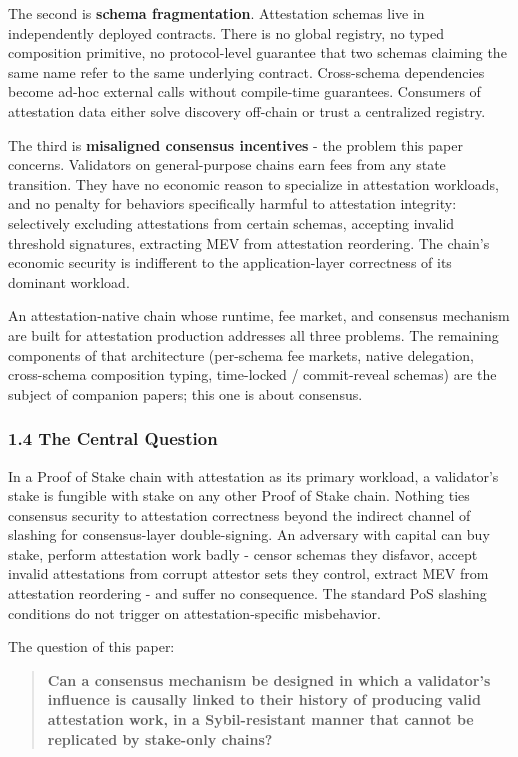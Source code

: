 \documentclass[
  11pt,
]{article}
\begin{document}
The second is \textbf{schema fragmentation}. Attestation schemas live in
independently deployed contracts. There is no global registry, no typed
composition primitive, no protocol-level guarantee that two schemas
claiming the same name refer to the same underlying contract.
Cross-schema dependencies become ad-hoc external calls without
compile-time guarantees. Consumers of attestation data either solve
discovery off-chain or trust a centralized registry.

The third is \textbf{misaligned consensus incentives} - the problem this
paper concerns. Validators on general-purpose chains earn fees from any
state transition. They have no economic reason to specialize in
attestation workloads, and no penalty for behaviors specifically harmful
to attestation integrity: selectively excluding attestations from
certain schemas, accepting invalid threshold signatures, extracting MEV
from attestation reordering. The chain's economic security is
indifferent to the application-layer correctness of its dominant
workload.

An attestation-native chain whose runtime, fee market, and consensus
mechanism are built for attestation production addresses all three
problems. The remaining components of that architecture (per-schema fee
markets, native delegation, cross-schema composition typing, time-locked
/ commit-reveal schemas) are the subject of companion papers; this one
is about consensus.

\subsubsection{1.4 The Central Question}\label{the-central-question}

In a Proof of Stake chain with attestation as its primary workload, a
validator's stake is fungible with stake on any other Proof of Stake
chain. Nothing ties consensus security to attestation correctness beyond
the indirect channel of slashing for consensus-layer double-signing. An
adversary with capital can buy stake, perform attestation work badly -
censor schemas they disfavor, accept invalid attestations from corrupt
attestor sets they control, extract MEV from attestation reordering -
and suffer no consequence. The standard PoS slashing conditions do not
trigger on attestation-specific misbehavior.

The question of this paper:

\begin{quote}
\textbf{Can a consensus mechanism be designed in which a validator's
influence is causally linked to their history of producing valid
attestation work, in a Sybil-resistant manner that cannot be replicated
by stake-only chains?}
\end{quote}
\end{document}
